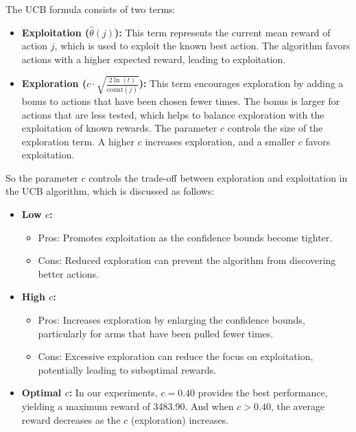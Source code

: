 \documentclass[11pt]{article}
\begin{document}
\begin{enumerate}[1.]
The UCB formula consists of two terms:

\begin{itemize}
    \item \textbf{Exploitation (\(\hat{\theta}(j)\)):} This term represents the current mean reward of action \(j\), which is used to exploit the known best action. The algorithm favors actions with a higher expected reward, leading to exploitation.
    
    \item \textbf{Exploration (\(c \cdot \sqrt{\frac{2 \ln(t)}{\text{count}(j)}}\)):} This term encourages exploration by adding a bonus to actions that have been chosen fewer times. The bonus is larger for actions that are less tested, which helps to balance exploration with the exploitation of known rewards. The parameter \(c\) controls the size of the exploration term. A higher \(c\) increases exploration, and a smaller \(c\) favors exploitation.
\end{itemize}
So the parameter \(c\) controls the trade-off between exploration and exploitation in the UCB algorithm, which is discussed as follows:
\begin{itemize}
    \item \textbf{Low \(c\):}
    \begin{itemize}
        \item Pros: Promotes exploitation as the confidence bounds become tighter.
        \item Cons: Reduced exploration can prevent the algorithm from discovering better actions.
    \end{itemize}
    
    \item \textbf{High \(c\):}
    \begin{itemize}
        \item Pros: Increases exploration by enlarging the confidence bounds, particularly for arms that have been pulled fewer times.
        \item Cons: Excessive exploration can reduce the focus on exploitation, potentially leading to suboptimal rewards.
    \end{itemize}
    
    \item \textbf{Optimal \(c\):} In our experiments, \(c = 0.40\) provides the best performance, yielding a maximum reward of 3483.90. And when \(c > 0.40\), the average reward decreases as the \(c\) (exploration) increases.
\end{itemize}


\end{enumerate}
\end{document}
